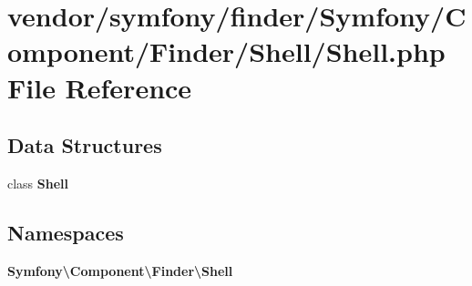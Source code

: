 \section{vendor/symfony/finder/\+Symfony/\+Component/\+Finder/\+Shell/\+Shell.php File Reference}
\label{symfony_2finder_2_symfony_2_component_2_finder_2_shell_2_shell_8php}
\subsection*{Data Structures}
\begin{DoxyCompactItemize}
\item 
class {\bf Shell}
\end{DoxyCompactItemize}
\subsection*{Namespaces}
\begin{DoxyCompactItemize}
\item 
 {\bf Symfony\textbackslash{}\+Component\textbackslash{}\+Finder\textbackslash{}\+Shell}
\end{DoxyCompactItemize}
